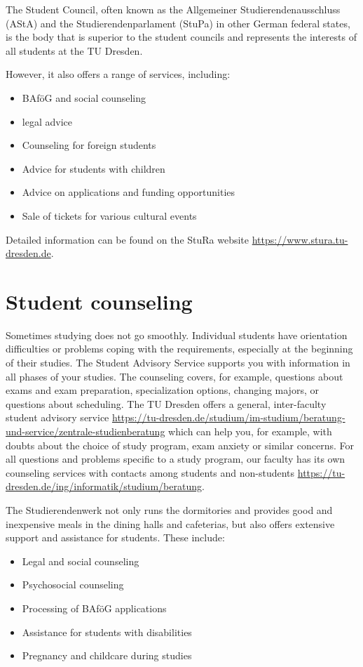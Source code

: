 The Student Council, often known as the Allgemeiner Studierendenausschluss (AStA) and the Studierendenparlament (StuPa) in other German federal states, is the body that is superior to the student councils and represents the interests of all students at the TU Dresden.

However, it also offers a range of services, including: 


\begin{itemize}
\item BAföG and social counseling
\item legal advice
\item Counseling for foreign students
\item Advice for students with children
\item Advice on applications and funding opportunities
\item Sale of tickets for various cultural events
\end{itemize}

Detailed information can be found on the StuRa website \url{https://www.stura.tu-dresden.de}.


\section{Student counseling}

Sometimes studying does not go smoothly. Individual students have orientation difficulties or problems coping with the requirements, especially at the beginning of their studies.
The Student Advisory Service supports you with information in all phases of your studies. The counseling covers, for example, questions about exams and exam preparation, specialization options, changing majors, or questions about scheduling.
The TU Dresden offers a general, inter-faculty student advisory service \url{https://tu-dresden.de/studium/im-studium/beratung-und-service/zentrale-studienberatung} 
which can help you, for example, with doubts about the choice of study program, exam anxiety or similar concerns.
For all questions and problems specific to a study program, our faculty has its own counseling services with contacts among students and non-students
\url{https://tu-dresden.de/ing/informatik/studium/beratung}.

\label{sec:stuwe}
The Studierendenwerk not only runs the dormitories and provides good and inexpensive meals in the dining halls and cafeterias, but also offers extensive support and assistance for students. These include:
\begin{itemize}
\item Legal and social counseling
\item Psychosocial counseling
\item Processing of BAföG applications
\item Assistance for students with disabilities
\item Pregnancy and childcare during studies
\end{itemize}

